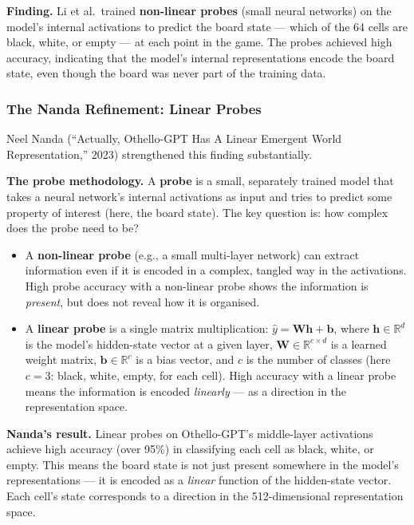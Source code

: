 \documentclass[11pt, a4paper]{article}
\begin{document}
\textbf{Finding.} Li et al.\ trained \textbf{non-linear probes}
(small neural networks) on the model's internal activations to predict
the board state --- which of the 64 cells are black, white, or empty ---
at each point in the game. The probes achieved high accuracy, indicating
that the model's internal representations encode the board state, even
though the board was never part of the training data.


\subsubsection{The Nanda Refinement: Linear Probes}

Neel Nanda (``Actually, Othello-GPT Has A Linear Emergent World
Representation,'' 2023) strengthened this finding substantially.

\textbf{The probe methodology.} A \textbf{probe} is a small, separately
trained model that takes a neural network's internal activations as input
and tries to predict some property of interest (here, the board state).
The key question is: how complex does the probe need to be?

\begin{itemize}[leftmargin=2em]
  \item A \textbf{non-linear probe} (e.g., a small multi-layer network)
    can extract information even if it is encoded in a complex, tangled
    way in the activations. High probe accuracy with a non-linear probe
    shows the information is \emph{present}, but does not reveal how it
    is organised.
  \item A \textbf{linear probe} is a single matrix multiplication:
    $\hat{y} = \mathbf{W} \mathbf{h} + \mathbf{b}$, where $\mathbf{h}
    \in \mathbb{R}^d$ is the model's hidden-state vector at a given layer,
    $\mathbf{W} \in \mathbb{R}^{c \times d}$ is a learned weight matrix,
    $\mathbf{b} \in \mathbb{R}^c$ is a bias vector, and $c$ is the number
    of classes (here $c = 3$: black, white, empty, for each cell). High
    accuracy with a linear probe means the information is encoded
    \emph{linearly} --- as a direction in the representation space.
\end{itemize}

\textbf{Nanda's result.} Linear probes on Othello-GPT's middle-layer
activations achieve high accuracy (over 95\%) in classifying each cell as
black, white, or empty. This means the board state is not just present
somewhere in the model's representations --- it is encoded as a
\emph{linear} function of the hidden-state vector. Each cell's state
corresponds to a direction in the 512-dimensional representation space.
\end{document}

